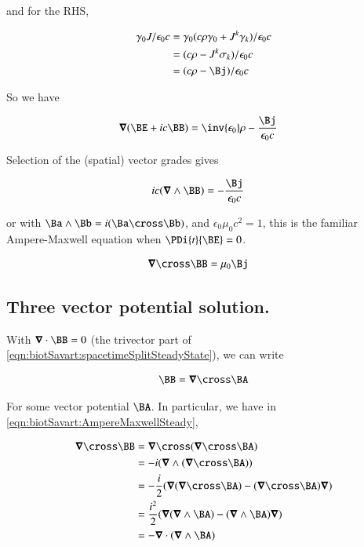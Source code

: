 and for the RHS,

\begin{align*}
\gamma_0 J/\epsilon_0 c
&=
\gamma_0 (c \rho \gamma_0 + J^k \gamma_k)/\epsilon_0 c  \\
&=
(c \rho - J^k \sigma_k)/\epsilon_0 c  \\
&=
(c \rho - \Bj)/\epsilon_0 c  \\
\end{align*}

So we have

\begin{align}\label{eqn:biotSavart:spacetimeSplitSteadyState}
\spacegrad (\BE + i c \BB)
&=
\inv{\epsilon_0}\rho - \frac{\Bj}{\epsilon_0 c}
\end{align}

Selection of the (spatial) vector grades gives

\begin{align*}
i c (\spacegrad \wedge \BB) &= - \frac{\Bj}{\epsilon_0 c}
\end{align*}

or with $\Ba \wedge \Bb = i (\Ba \cross \Bb)$, and $\epsilon_0 \mu_0 c^2 = 1$, this is the familiar Ampere-Maxwell equation when $\PDi{t}{\BE} = 0$.

\begin{align}\label{eqn:biotSavart:AmpereMaxwellSteady}
\spacegrad \cross \BB &= \mu_0 \Bj
\end{align}

\subsection{Three vector potential solution. }

With $\spacegrad \cdot \BB = 0$ (the trivector part of \ref{eqn:biotSavart:spacetimeSplitSteadyState}), we can write

\begin{align*}
\BB = \spacegrad \cross \BA
\end{align*}

For some vector potential $\BA$.  In particular, we have in \ref{eqn:biotSavart:AmpereMaxwellSteady},

\begin{align*}
\spacegrad \cross \BB
&=
\spacegrad \cross (\spacegrad \cross \BA) \\
&=
-i (\spacegrad \wedge (\spacegrad \cross \BA) ) \\
&=
-\frac{i}{2} (
\spacegrad (\spacegrad \cross \BA)
- (\spacegrad \cross \BA) \spacegrad
) \\
&=
\frac{i^2}{2} (
\spacegrad (\spacegrad \wedge \BA)
- (\spacegrad \wedge \BA) \spacegrad
) \\
&=
- \spacegrad \cdot (\spacegrad \wedge \BA)
\\
\end{align*}

